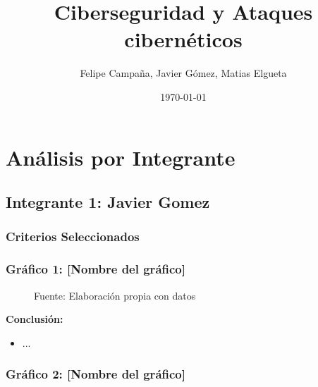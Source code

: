\documentclass[12pt, a4paper]{article}
\title{Ciberseguridad y Ataques cibernéticos}
\author{Felipe Campaña, Javier Gómez, Matias Elgueta}
\date{\today\\[2cm]}
\begin{document}
\maketitle

\vspace*{0.3cm}
\begin{figure}[H]
    \centering
    \begin{minipage}[t]{0.45\linewidth}
    \end{minipage}
    \hfill
    \begin{minipage}[t]{0.45\linewidth}
    \end{minipage}
\end{figure}



\section*{Análisis por Integrante}

\subsection*{Integrante 1: Javier Gomez}

\subsubsection*{Criterios Seleccionados}




\subsubsection*{Gráfico 1: [Nombre del gráfico]}
\begin{figure}[H]
    \centering
    \caption{Fuente: Elaboración propia con datos}
\end{figure}

\textbf{Conclusión:}
\begin{itemize}
    \item ...
\end{itemize}

\subsubsection*{Gráfico 2: [Nombre del gráfico]}
\begin{figure}[H]
    \
\end{figure}
\end{document}

